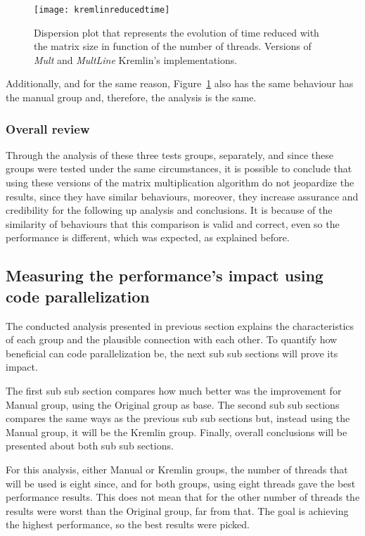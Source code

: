 \begin{figure}[htb]
	\begin{center}
		\leavevmode
		\texttt{[image: kremlinreducedtime]}
		\caption{Dispersion plot that represents the evolution of time reduced with the matrix size in function of the number of threads. Versions of \textit{Mult} and \textit{MultLine} Kremlin's implementations.}
		\label{fig:kremlinreducedtime}
	\end{center}
\end{figure}

Additionally, and for the same reason, Figure~\ref{fig:kremlinreducedtime} also has the same behaviour has the manual group and, therefore, the analysis is the same.

\subsubsection{Overall review}

Through the analysis of these three tests groups, separately, and since these groups were tested under the same circumstances, it is possible to conclude that using these versions of the matrix multiplication algorithm do not jeopardize the results, since they have similar behaviours, moreover, they increase assurance and credibility for the following up analysis and conclusions. It is because of the similarity of behaviours that this comparison is valid and correct, even so the performance is different, which was expected, as explained before.

\subsection{Measuring the performance's impact using code parallelization}\label{subsec:measureparallel}

The conducted analysis presented in previous section explains the characteristics of each group and the plausible connection with each other. To quantify how beneficial can code parallelization be, the next sub sub sections will prove its impact. 

The first sub sub section compares how much better was the improvement for Manual group, using the Original group as base. The second sub sub sections compares the same ways as the previous sub sub sections but, instead using the Manual group, it will be the Kremlin group. Finally, overall conclusions will be presented about both sub sub sections. 

For this analysis, either Manual or Kremlin groups, the number of threads that will be used is eight since, and for both groups, using eight threads gave the best performance results. This does not mean that for the other number of threads the results were worst than the Original group, far from that. The goal is achieving the highest performance, so the best results were picked.

